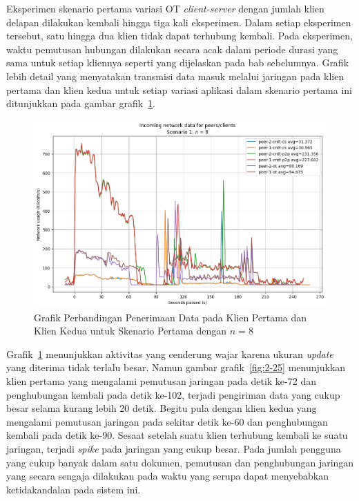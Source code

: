 Eksperimen skenario pertama variasi OT \textit{client-server} dengan jumlah klien delapan dilakukan kembali hingga tiga kali eksperimen. Dalam setiap eksperimen tersebut, satu hingga dua klien tidak dapat terhubung kembali. Pada eksperimen, waktu pemutusan hubungan dilakukan secara acak dalam periode durasi yang sama untuk setiap kliennya seperti yang dijelaskan pada bab sebelumnya. Grafik lebih detail yang menyatakan transmisi data masuk melalui jaringan pada klien pertama dan klien kedua untuk setiap variasi aplikasi dalam skenario pertama ini ditunjukkan pada gambar grafik~\ref{fig:2-23}.

\begin{figure}
 \centering
 \includegraphics[width=13cm]{./assets/skripsi/benchmark-vis_cell_2_output_23}
 \caption{Grafik Perbandingan Penerimaan Data pada Klien Pertama dan Klien Kedua untuk Skenario Pertama dengan $n = 8$}
 \label{fig:2-23}
\end{figure}

Grafik~\ref{fig:2-23} menunjukkan aktivitas yang cenderung wajar karena ukuran \textit{update} yang diterima tidak terlalu besar. Namun gambar grafik~\ref{fig:2-25} menunjukkan klien pertama yang mengalami pemutusan jaringan pada detik ke-72 dan penghubungan kembali pada detik ke-102, terjadi pengiriman data yang cukup besar selama kurang lebih 20 detik. Begitu pula dengan klien kedua yang mengalami pemutusan jaringan pada sekitar detik ke-60 dan penghubungan kembali pada detik ke-90. Sesaat setelah suatu klien terhubung kembali ke suatu jaringan, terjadi \textit{spike} pada jaringan yang cukup besar. Pada jumlah pengguna yang cukup banyak dalam satu dokumen, pemutusan dan penghubungan jaringan yang secara sengaja dilakukan pada waktu yang serupa dapat menyebabkan ketidakandalan pada sistem ini.

